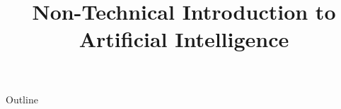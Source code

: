 \documentclass[xcolor=dvipsnames,compress,t,pdf,notes,9pt]{beamer}
\title[\insertframenumber /\inserttotalframenumber]{Non-Technical Introduction to Artificial Intelligence}
\begin{document}
	\begin{frame}
	\titlepage
	\end{frame}
	
	\begin{frame}{Outline}
	    \tableofcontents
	\end{frame}

	
	
	
\end{document}
